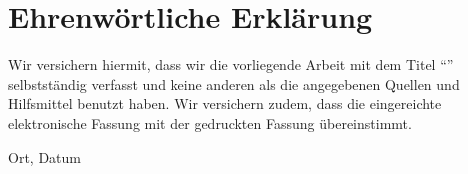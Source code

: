 \clearpage
\chapter*{Ehrenwörtliche Erklärung}


Wir versichern hiermit, dass wir die vorliegende Arbeit mit dem Titel \enquote{\textit{\DerTitelDerArbeit}} selbstständig verfasst und
keine anderen als die angegebenen Quellen und Hilfsmittel benutzt haben. Wir versichern zudem, dass die eingereichte elektronische
Fassung mit der gedruckten Fassung übereinstimmt.

\vspace{3cm}
Ort, Datum \hfill \DerAutorDerArbeit
